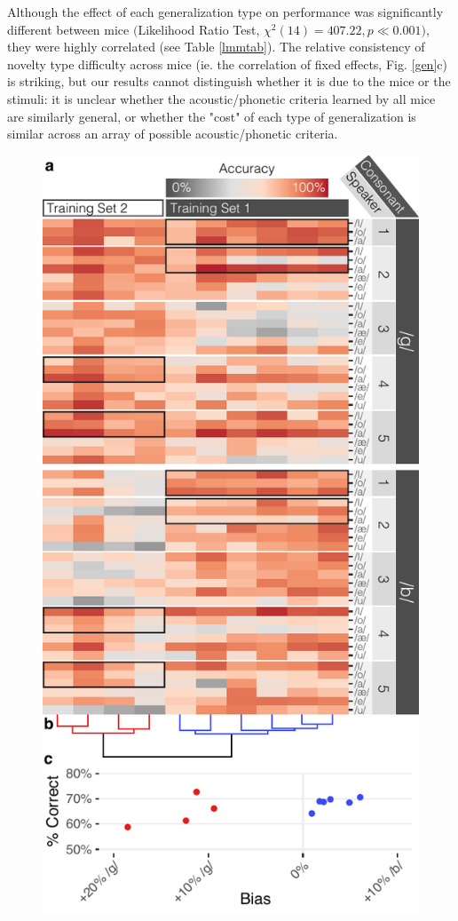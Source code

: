 \documentclass[11pt]{article}\usepackage[]{graphicx}\usepackage[]{color}
\begin{document}
Although the effect of each generalization type on performance was significantly different between mice $($Likelihood Ratio Test, $\chi^2(14) = 407.22, p \ll 0.001)$, they were highly correlated (see Table \ref{lmmtab}). The relative consistency of novelty type difficulty across mice (ie. the correlation of fixed effects, Fig. \ref{gen}c) is striking, but our results cannot distinguish whether it is due to the mice or the stimuli: it is unclear whether the acoustic/phonetic criteria learned by all mice are similarly general, or whether the "cost" of each type of generalization is similar across an array of possible acoustic/phonetic criteria.


\begin{figure}[!t]
\includegraphics[width=\linewidth]{../figures/Figure4.pdf}

\end{figure}
\end{document}
